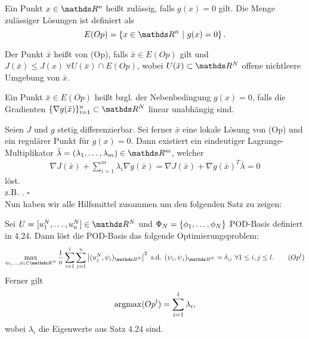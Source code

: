 Ein Punkt $x\in\R^n$ heißt zulässig, falls $g(x)=0$ gilt.
Die Menge zulässiger Lösungen ist definiert als
\[
E(Op) = \penbrace{x\in \R^n~|~g(x)=0}.
\]

Der Punkt $\bar{x}$ heißt  von (Op), falls $\bar{x}\in E(Op)$ gilt und $J(\bar{x})\le J(x) ~\forall U(\bar{x})\cap E(Op)$, wobei $U(\bar{x})\subset \R^N$ offene nichtleere Umgebung von $\bar{x}$.

Ein Punkt $\bar{x}\in E(Op)$ heißt  bzgl. der Nebenbedingung $g(x)=0$, falls die Gradienten $\{\nabla g(\bar{x})\}_{i=1}^n\subset \R^N$ linear unabhängig sind.

Seien $J$ und $g$ stetig differenzierbar.
Sei ferner $\bar{x}$ eine lokale Lösung von (Op) und ein regulärer Punkt für $g(x)=0$.
Dann existiert ein eindeutiger Lagrange-Multiplikator $\bar{\lambda}=(\lambda_1\dt{,}\lambda_m)\in \R^m$, welcher
\begin{align}
\nabla J(\bar{x}) + \sum_{i=1}^m \lambda_i \nabla g(\bar{x}) = \nabla J(\bar{x}) + \nabla g(\bar{x})^T \bar{\lambda} =0 
\end{align}
löst.\\

 z.B. \cite{NocWri06}.
\hfill $\square$\\

Nun haben wir alle Hilfsmittel zusammen um den folgenden Satz zu zeigen:

Sei $U = [u_1^N\dt{,}u_n^N]\in \R^N$ und $\Phi_N=\{\phi_1, \dots ,\phi_N\}$ POD-Basis definiert in 4.24.
Dann löst die POD-Basis das folgende Optimierungsproblem:
\begin{align*}
\max\limits_{\psi_1\dt{,}\psi_l\in \R^N} \frac{1}{n} \sum_{i=1}^l \sum_{j=1}^n \abs{(u_j^N,\psi_i)_{\R^N}}^2 \text{ s.d. } (\psi_i,\psi_j)_{\R^N} = \delta_{ij} ~\forall 1\le i,j\le l. \tag*{$(Op^l)$}
\end{align*}
Ferner gilt 
\[
\operatorname{argmax} (Op^l) = \sum_{i=1}^l \lambda_i,
\]
wobei $\lambda_i$ die Eigenwerte aus Satz 4.24 sind.

